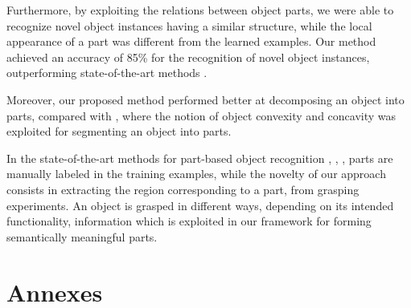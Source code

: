 \documentclass[a4paper,11pt,pdf]{pacmanreport}
\begin{document}
Furthermore, by exploiting the relations between object parts, we were able to recognize novel object instances having a similar structure, while the local appearance of a part was different from the learned examples. Our method achieved an accuracy of 85\% for the recognition of novel object instances, outperforming state-of-the-art methods \cite{vfh}. 

Moreover, our proposed method performed better at decomposing an object into parts, compared with \cite{rel7}, where the notion of object convexity and concavity was exploited for segmenting an object into parts.

In the state-of-the-art methods for part-based object recognition \cite{part2}, \cite{part1}, \cite{part3}, parts are manually labeled in the training examples, while the novelty of our approach consists in extracting the region corresponding to a part, from grasping experiments. An object is grasped in different ways, depending on its intended functionality, information which is exploited in our framework for forming semantically meaningful parts.

\newpage




\newpage 

\appendix 

\section{Annexes}

\end{document}
